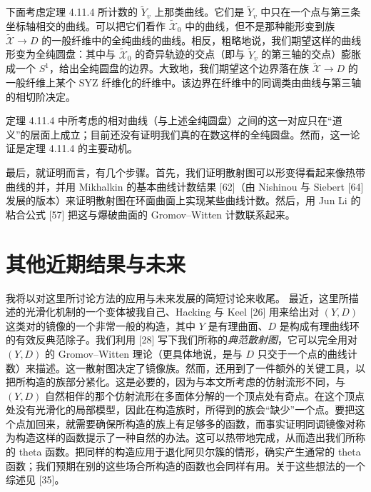 下面考虑定理 4.11.4 所计数的 $\tilde Y_v$ 上那类曲线。它们是 $\tilde Y_v$ 中只在一个点与第三条坐标轴相交的曲线。可以把它们看作 $\tilde{\mathcal{X}}_0$ 中的曲线，但不是那种能形变到族 $\tilde{\mathcal{X}}\to D$ 的一般纤维中的全纯曲线的曲线。相反，粗略地说，我们期望这样的曲线形变为全纯圆盘：其中与 $\tilde{\mathcal{X}}_0$ 的奇异轨迹的交点（即与 $\tilde Y_v$ 的第三轴的交点）膨胀成一个 $S^1$，给出全纯圆盘的边界。大致地，我们期望这个边界落在族 $\tilde{\mathcal{X}}\to D$ 的一般纤维上某个 SYZ 纤维化的纤维中。该边界在纤维中的同调类由曲线与第三轴的相切阶决定。

定理 4.11.4 中所考虑的相对曲线（与上述全纯圆盘）之间的这一对应只在“道义”的层面上成立；目前还没有证明我们真的在数这样的全纯圆盘。然而，这一论证是定理 4.11.4 的主要动机。

最后，就证明而言，有几个步骤。首先，我们证明散射图可以形变得看起来像热带曲线的并，并用 Mikhalkin 的基本曲线计数结果 [62]（由 Nishinou 与 Siebert [64] 发展的版本）来证明散射图在环面曲面上实现某些曲线计数。然后，用 Jun Li 的粘合公式 [57] 把这与爆破曲面的 Gromov--Witten 计数联系起来。

\section{其他近期结果与未来}

我将以对这里所讨论方法的应用与未来发展的简短讨论来收尾。
最近，这里所描述的光滑化机制的一个变体被我自己、Hacking 与 Keel [26] 用来给出对 $(Y,D)$ 这类对的镜像的一个非常一般的构造，其中 $Y$ 是有理曲面、$D$ 是构成有理曲线环的有效反典范除子。我们利用 [28] 写下我们所称的\emph{典范散射图}，它可以完全用对 $(Y,D)$ 的 Gromov--Witten 理论（更具体地说，是与 $D$ 只交于一个点的曲线计数）来描述。这一散射图决定了镜像族。然而，还用到了一件额外的关键工具，以把所构造的族部分紧化。这是必要的，因为与本文所考虑的仿射流形不同，与 $(Y,D)$ 自然相伴的那个仿射流形在多面体分解的一个顶点处有奇点。在这个顶点处没有光滑化的局部模型，因此在构造族时，所得到的族会“缺少”一个点。要把这个点加回来，就需要确保所构造的族上有足够多的函数，而事实证明同调镜像对称为构造这样的函数提示了一种自然的办法。这可以热带地完成，从而造出我们所称的 theta 函数。把同样的构造应用于退化阿贝尔簇的情形，确实产生通常的 theta 函数；我们预期在别的这些场合所构造的函数也会同样有用。关于这些想法的一个综述见 [35]。


